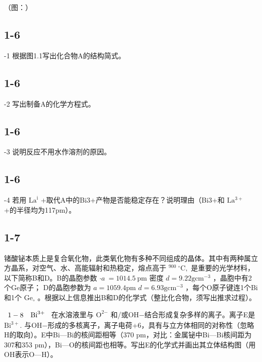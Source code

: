 （图：）

\subsection*{1-6}
-1 根据图1.1写出化合物A的结构简式。

\subsection*{1-6}
-2 写出制备A的化学⽅程式。

\subsection*{1-6}
-3 说明反应不⽤⽔作溶剂的原因。

\subsection*{1-6}
-4 若⽤ $\mathrm { L a } ^ { \mathrm { i } }$ +取代A中的Bi3+产物是否能稳定存在？说明理由（Bi3+和 $\mathrm { L a ^ { 3 + } }$ +的半径均为117pm）。

\subsection*{1-7}
锗酸铋本质上是复合氧化物，此类氧化物有多种不同组成的晶体。其中有两种属⽴⽅晶系，对空⽓、⽔、⾼能辐射和热稳定，熔点⾼于 ${ } ^ { 9 0 0 } \ { } ^ { \circ } \mathrm { C } ,$ 是重要的光学材料，以下简称B和D。B的晶胞参数 $\cdot a \ = 1 0 1 4 . 5 \ \mathrm { p m }$ 密度 $d = 9 . 2 2 \mathrm { g } \mathrm { c m } ^ { - 3 }$ ，晶胞中有2个Ge原⼦； D的晶胞参数为 $a = 1 0 5 9 . 4 \mathrm { p m }$ $d = 6 . 9 3 \mathrm { g c m ^ { - 3 } }$ ，每个O原⼦键连1个Bi和1个 $\mathrm { G e } _ { \circ }$ 。根据以上信息推出B和D的化学式（整⽐化合物，须写出推求过程）。

$\begin{array} { r l } { 1 - 8 } & { { } \mathrm { B i } ^ { 3 + } } \end{array}$ 在⽔溶液⾥与 $\mathrm { O ^ { 2 \mathrm { - } } }$ 和/或OH−结合形成复杂多样的离⼦。离⼦E是 $\mathrm { B i ^ { 3 + } } \mathrm { . }$ 与OH−形成的多核离⼦，离⼦电荷+6，具有与⽴⽅体相同的对称性（忽略H的取向）。E中Bi—Bi的核间距相等（370 pm，对⽐：⾦属铋中Bi—Bi核间距为307和353 pm），Bi—O的核间距也相等。写出E的化学式并画出其⽴体结构图（⽤OH表⽰O—H）。
